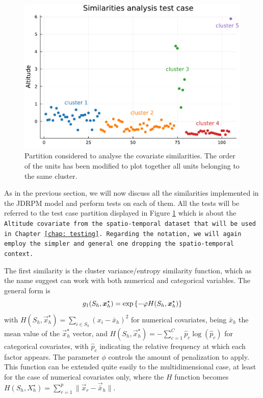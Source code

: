 \documentclass[12pt,	%
	a4paper,		%
	twoside,		%
	openright,		%
	titlepage,%
	]{book}
\theoremstyle{definition}
\begin{document}
\begin{figure}[ht!]
    \centering
    \includegraphics[width=1\linewidth]{model description/covariate similarity analysis/test case on 5 clusters/similarity_sorted_test.pdf}
    \caption[Partition considered for the similarity analysis]{Partition considered to analyse the covariate similarities. The order of the units has been modified to plot together all units belonging to the same cluster.}
    \label{fig: similarity tests}
\end{figure}


As in the previous section, we will now discuss all the similarities implemented in the JDRPM model and perform tests on each of them. All the tests will be referred to the test case partition displayed in Figure \ref{fig: similarity tests} which is about the \tt{Altitude} covariate from the spatio-temporal dataset that will be used in Chapter \ref{chap: testing}. Regarding the notation, we will again employ the simpler and general one dropping the spatio-temporal context.

The first similarity is the cluster variance/entropy similarity function, which as the name suggest can work with both numerical and categorical variables. The general form is 
\begin{equation}    
g_1(S_h,\boldsymbol{x}_{h}^\star) = \exp \left\{ -\varphi H(S_h,\boldsymbol{x}_{h}^\star) \right\}
\end{equation}
with $H(S_h,\vec{x}_{h}^\star) =  \sum_{i \in S_h} ( x_i - \bar{x}_h)^2 $ for numerical covariates, being $\bar x_h$ the mean value of the $\vec{x}_{h}^\star$ vector, and $H(S_h,\vec{x}_{h}^\star) = - \sum_{c=1}^C \hat p_c \log(\hat p_c)$ for categorical covariates, with $\hat p_c$ indicating the relative frequency at which each factor appears. The parameter $\phi$ controls the amount of penalization to apply. This function can be extended quite easily to the multidimensional case, at least for the case of numerical covariates only, where the $H$ function becomes $H(S_h,X_{h}^\star) =  \sum_{r=1}^p \| \vec{x}_{r} - \vec{\bar{x}}_h \|$.
\end{document}
